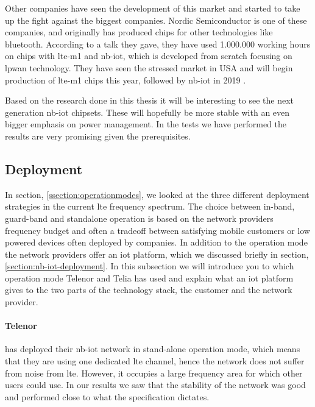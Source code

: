 \documentclass[USenglish]{ifimaster}  %
\begin{document}
Other companies have seen the development of this market and started to take up the fight against the biggest companies. Nordic Semiconductor is one of these companies, and originally has produced chips for other technologies like bluetooth. According to a talk they gave, they have used 1.000.000 working hours on chips with \acrshort{lte-m1} and \acrshort{nb-iot}, which is developed from scratch focusing on \acrshort{lpwan} technology. They have seen the stressed market in USA and will begin production of \acrshort{lte-m1} chips this year, followed by \acrshort{nb-iot} in 2019 \cite{person:ola}.

Based on the research done in this thesis it will be interesting to see the next generation \acrshort{nb-iot} chipsets. These will hopefully be more stable with an even bigger emphasis on power management. In the tests we have performed the results are very promising given the prerequisites.

\subsection{Deployment}
In section, \vref{ssection:operationmodes}, we looked at the three different deployment strategies in the current \acrshort{lte} frequency spectrum. The choice between in-band, guard-band and standalone operation is based on the network providers frequency budget and often a tradeoff between satisfying mobile customers or low powered devices often deployed by companies. In addition to the operation mode the network providers offer an \acrshort{iot} platform, which we discussed briefly in section, \vref{section:nb-iot-deployment}. In this subsection we will introduce you to which operation mode Telenor and Telia has used and explain what an \acrshort{iot} platform gives to the two parts of the technology stack, the customer and the network provider.

\paragraph{Telenor} has deployed their \acrshort{nb-iot} network in stand-alone operation mode, which means that they are using one dedicated \acrshort{lte} channel\cite{person:ola}, hence the network does not suffer from noise from \acrshort{lte}. However, it occupies a large frequency area for which other users could use. In our results we saw that the stability of the network was good and performed close to what the specification dictates.
\end{document}
